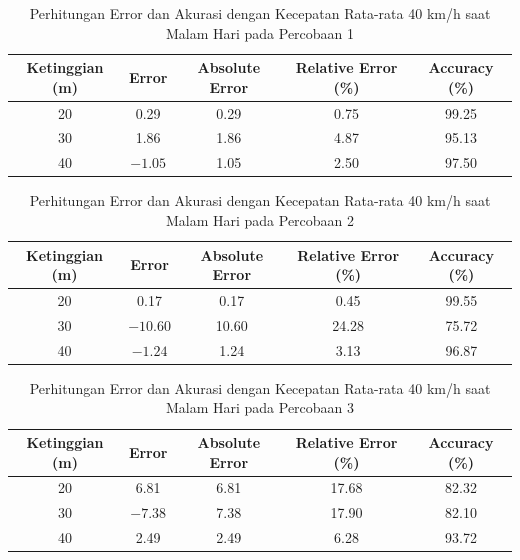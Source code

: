 \begin{table}[H]
  \caption{Perhitungan Error dan Akurasi dengan Kecepatan Rata-rata 40 km/h saat Malam Hari pada Percobaan 1}
  \label{tab:40kmh-malam-p1}
  \centering
  \begin{tabular}{|c|c|c|c|c|}
    \hline
    \textbf{Ketinggian (m)} & \textbf{Error} & \textbf{Absolute Error} & \textbf{Relative Error (\%)} & \textbf{Accuracy (\%)} \\
    \hline
    20 & 0.29  & 0.29 & 0.75 & 99.25 \\
    30 & 1.86  & 1.86 & 4.87 & 95.13 \\
    40 & \(-1.05\) & 1.05 & 2.50 & 97.50 \\
    \hline
  \end{tabular}
\end{table}
\vspace{-10pt}
\begin{table}[H]
  \caption{Perhitungan Error dan Akurasi dengan Kecepatan Rata-rata 40 km/h saat Malam Hari pada Percobaan 2}
  \label{tab:40kmh-malam-p2}
  \centering
  \begin{tabular}{|c|c|c|c|c|}
    \hline
    \textbf{Ketinggian (m)} & \textbf{Error} & \textbf{Absolute Error} & \textbf{Relative Error (\%)} & \textbf{Accuracy (\%)} \\
    \hline
    20 & 0.17  & 0.17 & 0.45 & 99.55 \\
    30 & \(-10.60\) & 10.60 & 24.28 & 75.72 \\
    40 & \(-1.24\) & 1.24 & 3.13 & 96.87 \\
    \hline
  \end{tabular}
\end{table}
\vspace{-10pt}
\begin{table}[H]
  \caption{Perhitungan Error dan Akurasi dengan Kecepatan Rata-rata 40 km/h saat Malam Hari pada Percobaan 3}
  \label{tab:40kmh-malam-p3}
  \centering
  \begin{tabular}{|c|c|c|c|c|}
    \hline
    \textbf{Ketinggian (m)} & \textbf{Error} & \textbf{Absolute Error} & \textbf{Relative Error (\%)} & \textbf{Accuracy (\%)} \\
    \hline
    20 & 6.81  & 6.81 & 17.68 & 82.32 \\
    30 & \(-7.38\) & 7.38 & 17.90 & 82.10 \\
    40 & 2.49  & 2.49 & 6.28 & 93.72 \\
    \hline
  \end{tabular}
\end{table}

